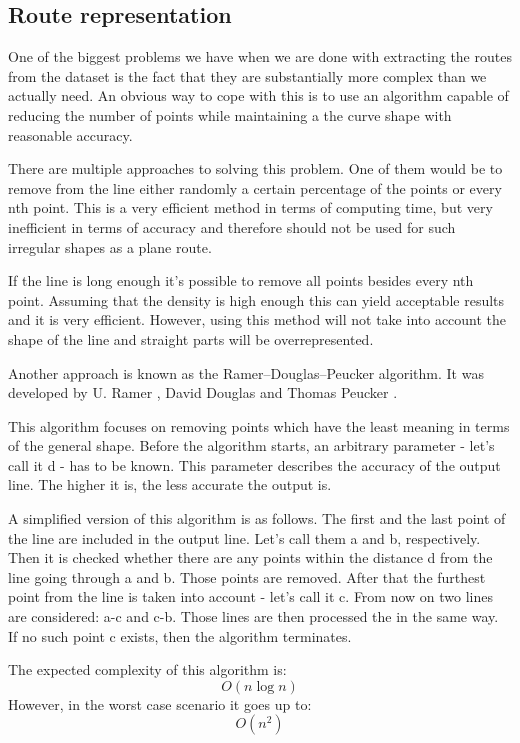 \documentclass{vldb}
\begin{document}
\subsection{Route representation}
One of the biggest problems we have when we are done with extracting 
the routes from the dataset is the fact that they are substantially more 
complex than we actually need. An obvious way to cope with this is to use 
an algorithm capable of reducing the number of points while maintaining 
a the curve shape with reasonable accuracy.

There are multiple approaches to solving this problem.
 One of them would be to remove from the line either randomly a certain 
percentage of the points or every nth point. This is a very efficient method 
in terms of computing time, but very inefficient in terms of accuracy 
and therefore should not be used for such irregular shapes as a plane route.

If the line is long enough it’s possible to remove all points besides every nth point. 
Assuming that the density is high enough this can yield acceptable results and it is 
very efficient. However, using this method will not take into account 
the shape of the line and straight parts will be overrepresented.

Another approach is known as the Ramer–Douglas–Peucker algorithm. 
It was developed by U. Ramer \cite{Ramer:polygonal}, David Douglas and Thomas Peucker \cite{Douglas:reduction}.

This algorithm focuses on removing points which have the least meaning 
in terms of the general shape. Before the algorithm starts, an arbitrary
 parameter - let’s call it d - has to be known. This parameter describes the 
accuracy of the output line. The higher it is, the less accurate the output is.

A simplified version of this algorithm is as follows. 
The first and the last point of the line are included in the output line. 
Let’s call them a and b, respectively. Then it is checked whether there are 
any points within the distance d from the line going through a and b. 
Those points are removed. After that the furthest point from the line is 
taken into account - let’s call it c. From now on two lines are considered: a-c and c-b. 
Those lines are then processed the in the same way. 
If no such point c exists, then the algorithm terminates.

The expected complexity of this algorithm is: \begin{displaymath}{O(n \log n)}\end{displaymath}
However, in the worst case scenario it goes up to: \begin{displaymath}{O(n^2)}\end{displaymath}
\end{document}
